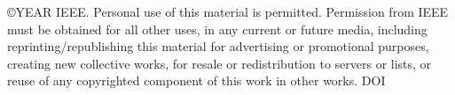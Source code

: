 \documentclass[a4paper,english,9pt]{article}
\begin{document}
\setlength{\parindent}{0in}

\thispagestyle{empty}
\scriptsize
\copyright YEAR IEEE. Personal use of this material is permitted. Permission
from IEEE must be obtained for all other uses, in any current or future media,
including reprinting/republishing this material for advertising or promotional
purposes, creating new collective works, for resale or redistribution to
servers or lists, or reuse of any copyrighted component of this work in other
works. DOI
\end{document}
